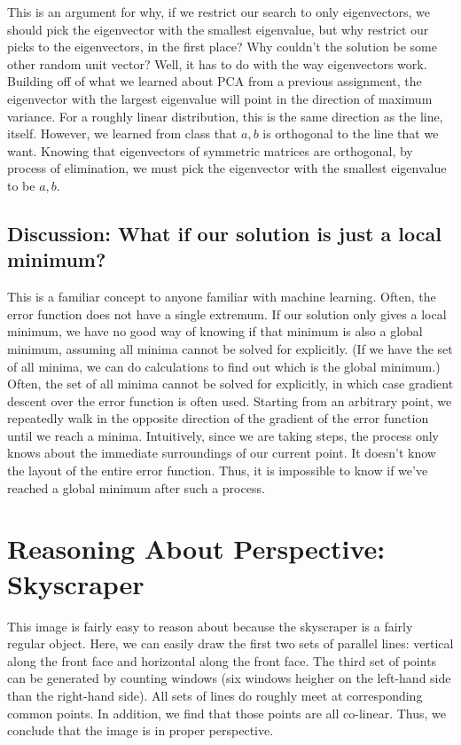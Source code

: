 \documentclass{article}
\begin{document}
This is an argument for why, if we restrict our search 
to only eigenvectors, we should pick the eigenvector with the smallest 
eigenvalue, but why restrict our picks to the eigenvectors, in the first place? Why 
couldn't the solution be some other random unit vector? Well, it has to do with 
the way eigenvectors work. Building off of what we learned about PCA from a 
previous assignment, the eigenvector with the largest eigenvalue will point in 
the direction of maximum variance. For a roughly linear distribution, this 
is the same direction as the line, itself. However, we learned from class that 
$a, b$ is orthogonal to the line that we want. Knowing that eigenvectors of 
symmetric matrices are orthogonal, by process of elimination, we must pick the 
eigenvector with the smallest eigenvalue to be $a, b$.

\subsection{Discussion: What if our solution is just a local minimum?}

This is a familiar concept to anyone familiar with machine learning. Often, the 
error function does not have a single extremum. If our solution only gives a local 
minimum, we have no good way of knowing if that minimum is also a global 
minimum, assuming all minima cannot be solved for explicitly. (If we have the 
set of all minima, we can do calculations to find out which is the global 
minimum.) Often, the set of all minima cannot be solved for explicitly, in which 
case gradient descent over the error function is often used. Starting from an 
arbitrary point, we repeatedly walk in the opposite direction of the gradient 
of the error function until we reach a minima. Intuitively, since we are taking 
steps, the process only knows about the immediate surroundings of our current 
point. It doesn't know the layout of the entire error function. Thus, it is 
impossible to know if we've reached a global minimum after such a process.

\section{Reasoning About Perspective: Skyscraper}

This image is fairly easy to reason about because the skyscraper is a fairly 
regular object. Here, we can easily draw the first two sets of parallel lines: 
vertical along the front face and horizontal along the front face. 
The third set of points can be generated by 
counting windows (six windows heigher on the left-hand side than the right-hand 
side). All sets of lines do roughly meet at corresponding common points. In 
addition, we find that those points are all co-linear. Thus, we conclude that 
the image is in proper perspective.
\end{document}
